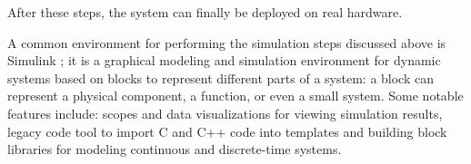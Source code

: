 After these steps, the system can finally be deployed on real hardware.

A common environment for performing the simulation steps discussed above is Simulink \cite{Simulink}; it is a graphical modeling and simulation environment for dynamic systems based on blocks to represent different parts of a system: a block can represent a physical component, a function, or even a small system. Some notable features include: scopes and data visualizations for viewing simulation results, legacy code tool to import C and C++ code into templates and building block libraries for modeling continuous and discrete-time systems.



